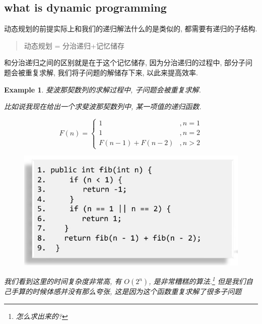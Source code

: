 \documentclass[a4paper, 10pt]{ctexart} %
\newtheorem{example}{Example}
\begin{document}
\subsection{what is dynamic programming}
动态规划的前提实际上和我们的递归解法什么的是类似的, 都需要有递归的子结构.
\begin{quotation}
    动态规划 = 分治递归+记忆储存
\end{quotation}
和分治递归之间的区别就是在于这个记忆储存, 因为分治递归的过程中, 
部分子问题会被重复求解, 
我们将子问题的解储存下来, 以此来提高效率.
\begin{example}
    斐波那契数列的求解过程中, 子问题会被重复求解. 
    
    比如说我现在给出一个求斐波那契数列中, 某一项值的递归函数.

    \[
    F(n) = 
    \begin{cases}
        1& ,  n =1  \\ 
        1 & , n=2  \\
        F\left(n-1\right) + F\left(n-2\right)& , n>2
    \end{cases}
    \]

    \begin{figure}[H]
        \centering
        \includegraphics[scale = 0.5]{1.jpg}
    \end{figure}

    我们看到这里的时间复杂度非常高, 有 $O\left(2^{n}\right)$, 是非常糟糕的算法.\footnote{怎么求出来的?}
    但是我们自己手算的时候体感并没有那么夸张, 这是因为这个函数重复求解了很多子问题


\end{example}
\end{document}
